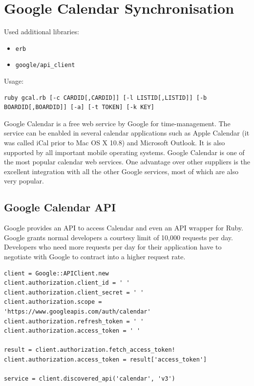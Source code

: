 \section{Google Calendar Synchronisation}
Used additional libraries:
\begin{itemize}
	\item \texttt{erb}
	\item \texttt{google/api\_client}
\end{itemize}

Usage:
\begin{lstlisting}[aboveskip=1\baselineskip, style=bash, caption=\texttt{gcal.rb} usage., label=listing025]
ruby gcal.rb [-c CARDID[,CARDID]] [-l LISTID[,LISTID]] [-b BOARDID[,BOARDID]] [-a] [-t TOKEN] [-k KEY]
\end{lstlisting}

Google Calendar is a free web service by Google for time-management. The service can be enabled in several calendar applications such as Apple Calendar (it was called iCal prior to Mac OS X 10.8) and Microsoft Outlook. It is also supported by all important mobile operating systems. Google Calendar is one of the most popular calendar web services. One advantage over other suppliers is the excellent integration with all the other Google services, most of which are also very popular.

\subsection{Google Calendar API}
Google provides an API to access Calendar and even an API wrapper for Ruby. Google grants normal developers a courtesy limit of 10,000 requests per day. Developers who need more requests per day for their application have to negotiate with Google to contract into a higher request rate.

\begin{lstlisting}[aboveskip=1\baselineskip, caption=Initialisation of the Google Calendar API connection., label=listing017]
client = Google::APIClient.new
client.authorization.client_id = ' '
client.authorization.client_secret = ' '
client.authorization.scope = 'https://www.googleapis.com/auth/calendar'
client.authorization.refresh_token = ' '
client.authorization.access_token = ' '

result = client.authorization.fetch_access_token!
client.authorization.access_token = result['access_token']

service = client.discovered_api('calendar', 'v3')
\end{lstlisting}

